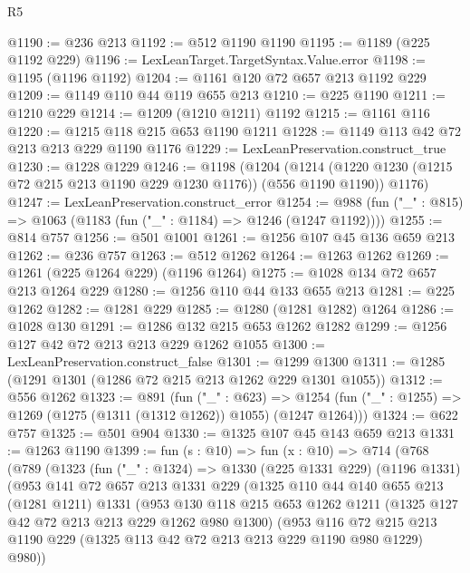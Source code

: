 \begin{lexlean}{R5}
\begin{coremodule}
{{{{{{{{{{{{{@1190 := @236 @213
@1192 := @512 @1190 @1190
@1195 := @1189 (@225 @1192 @229)
@1196 := LexLeanTarget.TargetSyntax.Value.error
@1198 := @1195 (@1196 @1192)
@1204 := @1161 @120 @72 @657 @213 @1192 @229
@1209 := @1149 @110 @44 @119 @655 @213
@1210 := @225 @1190
@1211 := @1210 @229
@1214 := @1209 (@1210 @1211) @1192
@1215 := @1161 @116
@1220 := @1215 @118 @215 @653 @1190 @1211
@1228 := @1149 @113 @42 @72 @213 @213 @229 @1190 @1176
@1229 := LexLeanPreservation.construct_true
@1230 := @1228 @1229
@1246 := @1198
    (@1204
      (@1214 (@1220 @1230 (@1215 @72 @215 @213 @1190 @229 @1230 @1176)) (@556 @1190 @1190))
      @1176)
@1247 := LexLeanPreservation.construct_error
@1254 := @988 (fun ("_" : @815) => @1063 (@1183 (fun ("_" : @1184) => @1246 (@1247 @1192))))
@1255 := @814 @757
@1256 := @501 @1001
@1261 := @1256 @107 @45 @136 @659 @213
@1262 := @236 @757
@1263 := @512 @1262
@1264 := @1263 @1262
@1269 := @1261 (@225 @1264 @229) (@1196 @1264)
@1275 := @1028 @134 @72 @657 @213 @1264 @229
@1280 := @1256 @110 @44 @133 @655 @213
@1281 := @225 @1262
@1282 := @1281 @229
@1285 := @1280 (@1281 @1282) @1264
@1286 := @1028 @130
@1291 := @1286 @132 @215 @653 @1262 @1282
@1299 := @1256 @127 @42 @72 @213 @213 @229 @1262 @1055
@1300 := LexLeanPreservation.construct_false
@1301 := @1299 @1300
@1311 := @1285 (@1291 @1301 (@1286 @72 @215 @213 @1262 @229 @1301 @1055))
@1312 := @556 @1262
@1323 := @891
    (fun ("_" : @623) =>
    @1254 (fun ("_" : @1255) => @1269 (@1275 (@1311 (@1312 @1262)) @1055) (@1247 @1264)))
@1324 := @622 @757
@1325 := @501 @904
@1330 := @1325 @107 @45 @143 @659 @213
@1331 := @1263 @1190
@1399 := fun (s : @10) =>
  fun (x : @10) =>
  @714
    (@768
      (@789
        (@1323
          (fun ("_" : @1324) =>
          @1330
            (@225 @1331 @229)
            (@1196 @1331)
            (@953
              @141
              @72
              @657
              @213
              @1331
              @229
              (@1325
                @110
                @44
                @140
                @655
                @213
                (@1281 @1211)
                @1331
                (@953
                  @130
                  @118
                  @215
                  @653
                  @1262
                  @1211
                  (@1325 @127 @42 @72 @213 @213 @229 @1262 @980 @1300)
                  (@953
                    @116
                    @72
                    @215
                    @213
                    @1190
                    @229
                    (@1325 @113 @42 @72 @213 @213 @229 @1190 @980 @1229)
                    @980))
}}}}}}}}}}}}}
\end{coremodule}
\end{lexlean}
